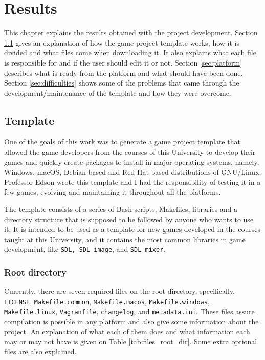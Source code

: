 \chapter[Results]{Results}
\label{sec:results}

This chapter explains the results obtained with the project development. Section \ref{sec:template} gives an explanation of how the game project template works, how it is divided and what files come when downloading it. It also explains what each file is responsible for and if the user should edit it or not. Section \ref{sec:platform} describes what is ready from the platform and what should have been done. Section \ref{sec:difficulties} shows some of the problems that came through the development/maintenance of the template and how they were overcome.


\section{Template}
\label{sec:template}

One of the goals of this work was to generate a game project template that allowed the game developers from the courses of this University to develop their games and quickly create packages to install in major operating systems, namely, Windows, macOS, Debian-based and Red Hat based distributions of GNU/Linux. Professor Edson wrote this template and I had the responsibility of testing it in a few games, evolving and maintaining it throughout all the platforms.

The template consists of a series of Bash scripts, Makefiles, libraries and a directory structure that is supposed to be followed by anyone who wants to use it. It is intended to be used as a template for new games developed in the courses taught at this University, and it contains the most common libraries in game development, like \texttt{SDL, SDL\_image}, and \texttt{SDL\_mixer}.

\subsection{Root directory}
\label{sec:root_directory}

Currently, there are seven required files on the root directory, specifically, \texttt{LICENSE}, \texttt{Makefile.common}, \texttt{Makefile.macos}, \texttt{Makefile.windows}, \texttt{Makefile.linux}, \texttt{Vagranfile}, \texttt{changelog}, and \texttt{metadata.ini}. These files assure compilation is possible in any platform and also give some information about the project. An explanation of what each of them does and what information each may or may not have is given on Table \ref{tab:files_root_dir}. Some extra optional files are also explained.


